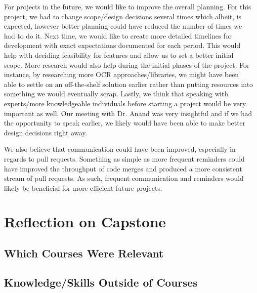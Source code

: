 \documentclass{article}
\begin{document}
For projects in the future, we would like to improve the overall planning. For this project, we had to change scope/design decisions several
times which albeit, is expected, however better planning could have reduced the number of
times we had to do it. Next time, we would like to create more detailed timelines for development with exact
expectations documented for each period. This would help with deciding feasibility for features and allow us
to set a better initial scope. More research would also help during the initial phases of the project.
For instance, by researching more OCR approaches/libraries, we might have been able to settle on an off-the-shelf solution
earlier rather than putting resources into something we would eventually scrap. Lastly, we think that speaking with experts/more
knowledgeable individuals before starting a project would be very important as well. Our meeting with Dr. Anand was very insightful
and if we had the opportunity to speak earlier, we likely would have been able to make better design decisions right away.

We also believe that communication could have been improved, especially in regards to pull requests.
Something as simple as more frequent reminders could have improved the throughput of code merges and produced a more
consistent stream of pull requests. As such, frequent communication and reminders would likely be beneficial for more efficient future
projects.

\section{Reflection on Capstone}


\subsection{Which Courses Were Relevant}


\subsection{Knowledge/Skills Outside of Courses}

\end{document}
